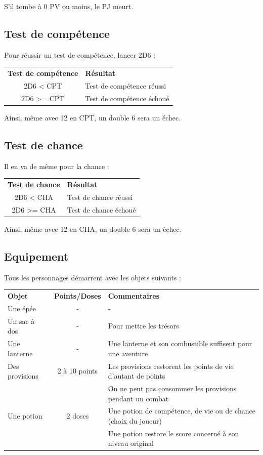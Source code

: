 \documentclass[a4paper, 11pt, twoside]{article}
\begin{document}
S'il tombe à 0 PV ou moins, le PJ meurt.

\newpage

\subsection{Test de compétence}
\label{sec:orgad07055}

Pour réussir un test de compétence, lancer 2D6 :

\begin{longtable}{cl}
\textbf{Test de compétence} & \textbf{Résultat}\\
2D6 < CPT & Test de compétence réussi\\
2D6 >= CPT & Test de compétence échoué\\
\end{longtable}

Ainsi, même avec 12 en CPT, un double 6 sera un échec.

\subsection{Test de chance}
\label{sec:org1cf5a91}

Il en va de même pour la chance :

\begin{longtable}{cl}
\textbf{Test de chance} & \textbf{Résultat}\\
2D6 < CHA & Test de chance réussi\\
2D6 >= CHA & Test de chance échoué\\
\end{longtable}

Ainsi, même avec 12 en CHA, un double 6 sera un échec.

\subsection{Equipement}
\label{sec:org1c97dbc}

Tous les personnages démarrent avec les objets suivants :

\begin{longtable}{lcl}
\textbf{Objet} & \textbf{Points/Doses} & \textbf{Commentaires}\\
Une épée & - & -\\
Un sac à dos & - & Pour mettre les trésors\\
Une lanterne & - & Une lanterne et son combustible suffisent pour une aventure\\
Des provisions & 2 à 10 points & Les provisions restorent les points de vie d'autant de points\\
 &  & On ne peut pas consommer les provisions pendant un combat\\
Une potion & 2 doses & Une potion de compétence, de vie ou de chance (choix du joueur)\\
 &  & Une potion restore le score concerné à son niveau original\\
\end{longtable}
\end{document}
